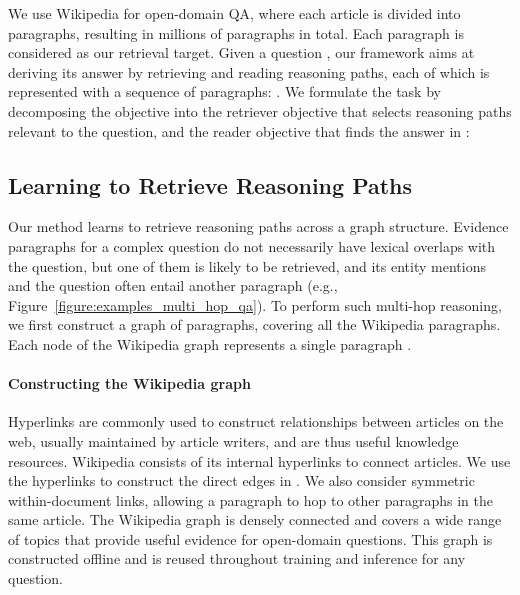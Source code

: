 \documentclass{article} \usepackage{iclr2020_conference,times}
\begin{document}
\fi

We use Wikipedia for open-domain QA, where each article is divided into paragraphs, resulting in millions of paragraphs in total.
Each paragraph  is considered as our retrieval target.
Given a question , our framework aims at deriving its answer  by retrieving and reading reasoning paths, each of which is represented with a sequence of paragraphs: .
We formulate the task by decomposing the objective into the retriever objective  that selects reasoning paths  relevant to the question, and the reader objective  that finds the answer  in :
  

\subsection{Learning to Retrieve Reasoning Paths}
\label{sec:retriever}
Our method learns to retrieve reasoning paths across a graph structure. 
Evidence paragraphs for a complex question do not necessarily have lexical overlaps with the question, but one of them is likely to be retrieved, and its entity mentions and the question often entail another paragraph (e.g., Figure~\ref{figure:examples_multi_hop_qa}).
To perform such multi-hop reasoning, we first construct a graph of paragraphs, covering all the Wikipedia paragraphs.
Each node of the Wikipedia graph  represents a single paragraph .


\vspace{-2mm}\paragraph{Constructing the Wikipedia graph}
Hyperlinks are commonly used to construct relationships between articles on the web, usually maintained by article writers, and are thus useful knowledge resources.
Wikipedia consists of its internal hyperlinks to connect articles. 
We use the hyperlinks to construct the direct edges in .
We also consider symmetric within-document links, allowing a paragraph to hop to other paragraphs in the same article.
The Wikipedia graph  is densely connected and covers a wide range of topics that provide useful evidence for open-domain questions.
This graph is constructed offline and is reused throughout training and inference for any question.
\end{document}

